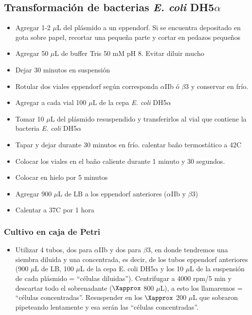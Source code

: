 \begin{appendix}
\section{Transformación de bacterias \emph{E. coli} DH5$\alpha$}
      \begin{itemize}
      \item{Agregar 1-2 $\mu$L del plásmido a un eppendorf. Si se encuentra depositado en gota sobre papel, recortar una pequeña parte y cortar en pedazos pequeños}
        \item{Agregar 50 $\mu$L de buffer Tris 50 mM pH 8. Evitar diluir mucho}
        \item{Dejar 30 minutos en suspensión}
        \item{Rotular dos viales eppendorf según corresponda $\alpha$IIb ó $\beta$3 y conservar en frío.}
        \item{Agregar a cada vial 100 $\mu$L de la cepa \emph{E. coli} DH5$\alpha$}
        \item{Tomar 10 $\mu$L del plásmido resuspendido y transferirlos al vial que contiene la bacteria \emph{E. coli} DH5$\alpha$}
        \item{Tapar y dejar durante 30 minutos en frío. calentar baño termostático a 42\textdegree C}
        \item{Colocar los viales en el baño caliente durante 1 minuto y 30 segundos.}
        \item{Colocar en hielo por 5 minutos}
        \item{Agregar 900 $\mu$L de LB a los eppendorf anteriores ($\alpha$IIb y $\beta$3)}
        \item{Calentar a 37\textdegree C por 1 hora}
    \end{itemize}
        
\subsubsection{Cultivo en caja de Petri}

\begin{itemize}
\item{Utilizar 4 tubos, dos para $\alpha$IIb y dos para $\beta$3, en donde tendremos una siembra diluida y una concentrada, es decir, de los tubos eppendorf anteriores (900 $\mu$L de LB, 100 $\mu$L de la cepa E. coli DH5$\alpha$ y los 10 $\mu$L de la suspensión de cada plásmido = “células diluidas”). 
Centrifugar a 4000 rpm/5 min y descartar todo el sobrenadante ($\Xapprox$ 800 $\mu$L), a esto los llamaremos  = “células concentradas”. Resuspender en los $\Xapprox$ 200 $\mu$L que sobraron pipeteando lentamente y esa serán las “células concentradas”.}


\end{itemize}
\end{appendix}

